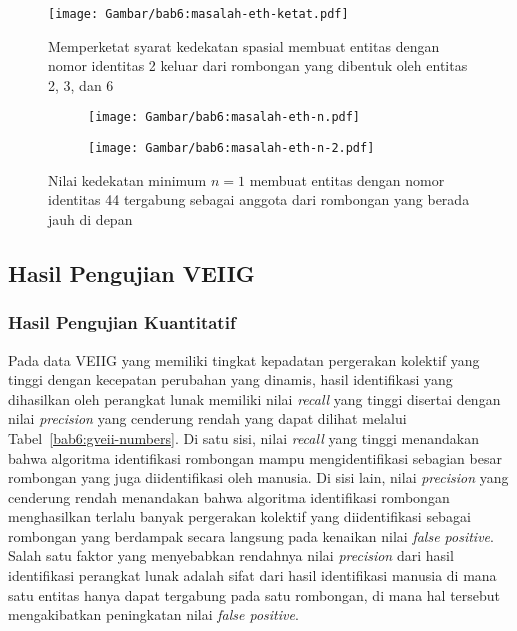 \begin{figure}[h]
    \centering
    \captionsetup{width=0.6\textwidth}
    \texttt{[image: Gambar/bab6:masalah-eth-ketat.pdf]}
    \caption[Dampak ketatnya syarat kedekatan spasial pada data ETH]{Memperketat syarat kedekatan spasial membuat entitas dengan nomor identitas 2 keluar dari rombongan yang dibentuk oleh entitas 2, 3, dan 6}
    \label{bab6:masalah-syarat-ketat-eth}
\end{figure}

\begin{figure}[b!]
    \centering
    \captionsetup{width=.6\textwidth}
    \begin{subfigure}[h]{0.15\textwidth}
        \centering
        \texttt{[image: Gambar/bab6:masalah-eth-n.pdf]}
    \end{subfigure}
    \begin{subfigure}[h]{0.15\textwidth}
        \centering
        \texttt{[image: Gambar/bab6:masalah-eth-n-2.pdf]}
    \end{subfigure}
    \caption[Masalah nilai $n$ pada data BIWI ETH]{Nilai kedekatan minimum $n = 1$ membuat entitas dengan nomor identitas 44 tergabung sebagai anggota dari rombongan yang berada jauh di depan}
    \label{bab6:masalah-eth-n}
\end{figure}

\subsection{Hasil Pengujian VEIIG}
\label{subsec:veiig-result}

\subsubsection{Hasil Pengujian Kuantitatif}
\label{subsubsec:veiig-quantitative}

Pada data VEIIG yang memiliki tingkat kepadatan pergerakan kolektif yang tinggi dengan kecepatan perubahan yang dinamis, hasil identifikasi yang dihasilkan oleh perangkat lunak memiliki nilai \textit{recall} yang tinggi disertai dengan nilai \textit{precision} yang cenderung rendah yang dapat dilihat melalui Tabel~\ref{bab6:gveii-numbers}. Di satu sisi, nilai \textit{recall} yang tinggi menandakan bahwa algoritma identifikasi rombongan mampu mengidentifikasi sebagian besar rombongan yang juga diidentifikasi oleh manusia. Di sisi lain, nilai \textit{precision} yang cenderung rendah menandakan bahwa algoritma identifikasi rombongan menghasilkan terlalu banyak pergerakan kolektif yang diidentifikasi sebagai rombongan yang berdampak secara langsung pada kenaikan nilai \textit{false positive}. Salah satu faktor yang menyebabkan rendahnya nilai \textit{precision} dari hasil identifikasi perangkat lunak adalah sifat dari hasil identifikasi manusia di mana satu entitas hanya dapat tergabung pada satu rombongan, di mana hal tersebut mengakibatkan peningkatan nilai \textit{false positive}.

